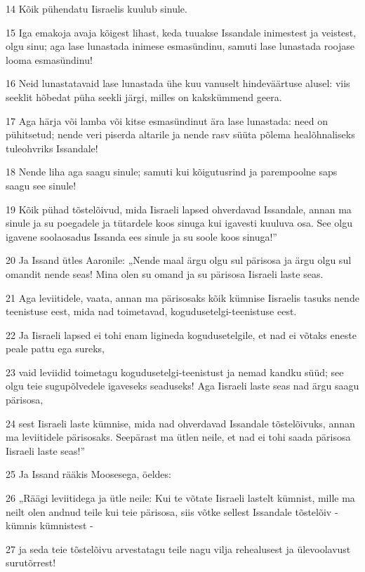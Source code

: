\par 14 Kõik pühendatu Iisraelis kuulub sinule.
\par 15 Iga emakoja avaja kõigest lihast, keda tuuakse Issandale inimestest ja veistest, olgu sinu; aga lase lunastada inimese esmasündinu, samuti lase lunastada roojase looma esmasündinu!
\par 16 Neid lunastatavaid lase lunastada ühe kuu vanuselt hindeväärtuse alusel: viis seeklit hõbedat püha seekli järgi, milles on kakskümmend geera.
\par 17 Aga härja või lamba või kitse esmasündinut ära lase lunastada: need on pühitsetud; nende veri piserda altarile ja nende rasv süüta põlema healõhnaliseks tuleohvriks Issandale!
\par 18 Nende liha aga saagu sinule; samuti kui kõigutusrind ja parempoolne saps saagu see sinule!
\par 19 Kõik pühad tõstelõivud, mida Iisraeli lapsed ohverdavad Issandale, annan ma sinule ja su poegadele ja tütardele koos sinuga kui igavesti kuuluva osa. See olgu igavene soolaosadus Issanda ees sinule ja su soole koos sinuga!”
\par 20 Ja Issand ütles Aaronile: „Nende maal ärgu olgu sul pärisosa ja ärgu olgu sul omandit nende seas! Mina olen su omand ja su pärisosa Iisraeli laste seas.
\par 21 Aga leviitidele, vaata, annan ma pärisosaks kõik kümnise Iisraelis tasuks nende teenistuse eest, mida nad toimetavad, kogudusetelgi-teenistuse eest.
\par 22 Ja Iisraeli lapsed ei tohi enam ligineda kogudusetelgile, et nad ei võtaks eneste peale pattu ega sureks,
\par 23 vaid leviidid toimetagu kogudusetelgi-teenistust ja nemad kandku süüd; see olgu teie sugupõlvedele igaveseks seaduseks! Aga Iisraeli laste seas nad ärgu saagu pärisosa,
\par 24 sest Iisraeli laste kümnise, mida nad ohverdavad Issandale tõstelõivuks, annan ma leviitidele pärisosaks. Seepärast ma ütlen neile, et nad ei tohi saada pärisosa Iisraeli laste seas!”
\par 25 Ja Issand rääkis Moosesega, öeldes:
\par 26 „Räägi leviitidega ja ütle neile: Kui te võtate Iisraeli lastelt kümnist, mille ma neilt olen andnud teile kui teie pärisosa, siis võtke sellest Issandale tõstelõiv - kümnis kümnistest -
\par 27 ja seda teie tõstelõivu arvestatagu teile nagu vilja rehealusest ja ülevoolavust surutõrrest!
